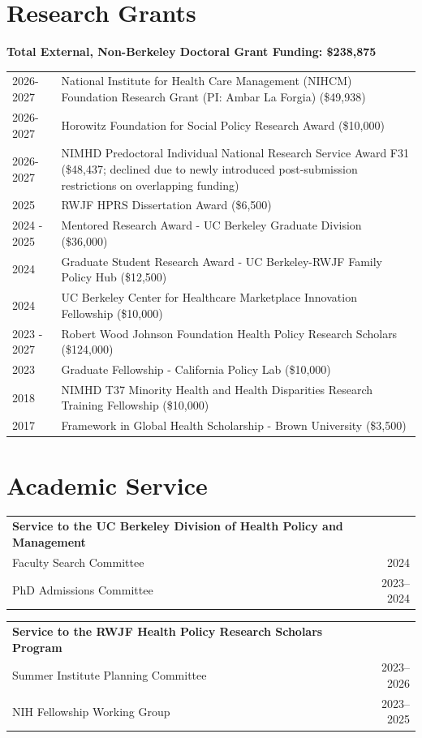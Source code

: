 \documentclass[letterpaper,11pt]{article}
\begin{document}
\section{Research Grants}
\textbf{Total External, Non-Berkeley Doctoral Grant Funding: \$238,875} \\
\begin{tabularx}{\linewidth}{@{}l X@{}}	
2026-2027 & National Institute for Health Care Management (NIHCM) Foundation Research Grant (PI: Ambar La Forgia) (\$49,938) \\
2026-2027 & Horowitz Foundation for Social Policy Research Award (\$10,000) \\
2026-2027 & NIMHD Predoctoral Individual National Research Service Award F31 (\$48,437; declined due to newly introduced post-submission restrictions on overlapping funding)\\
2025 &  RWJF HPRS Dissertation Award (\$6,500)\\
2024 - 2025 & Mentored Research Award - UC Berkeley Graduate Division (\$36,000)\\
2024 & Graduate Student Research Award - UC Berkeley-RWJF Family Policy Hub (\$12,500) \\
2024 & UC Berkeley Center for Healthcare Marketplace Innovation Fellowship (\$10,000) \\
2023 - 2027 & Robert Wood Johnson Foundation Health Policy Research Scholars (\$124,000)\\
2023 & Graduate Fellowship - California Policy Lab (\$10,000) \\
2018 & NIMHD T37 Minority Health and Health Disparities Research Training Fellowship (\$10,000) \\
2017 & Framework in Global Health Scholarship - Brown University (\$3,500) \\
\end{tabularx}

\section{Academic Service}
\begin{tabularx}{\linewidth}{@{}X r@{}}
\textbf{Service to the UC Berkeley Division of Health Policy and Management} \\
Faculty Search Committee & \hfill 2024 \\
PhD Admissions Committee & \hfill 2023--2024 \\
\end{tabularx}

\begin{tabularx}{\linewidth}{@{}X r@{}}
\textbf{Service to the RWJF Health Policy Research Scholars Program} \\
Summer Institute Planning Committee & \hfill 2023--2026 \\
NIH Fellowship Working Group & \hfill 2023--2025 \\
\end{tabularx}
\end{document}
